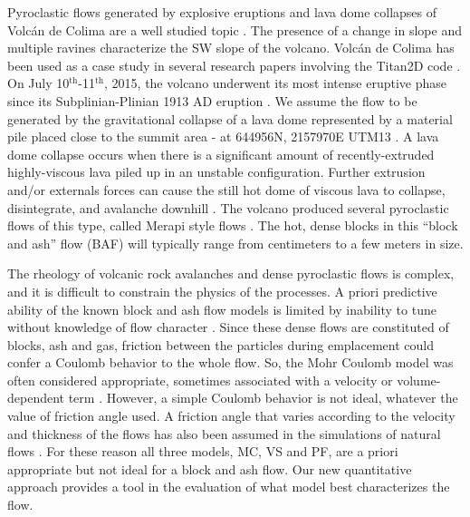 \documentclass{article}
\begin{document}
Pyroclastic flows generated by explosive eruptions and lava dome collapses of Volc{\'a}n de Colima are a well studied topic \citep{DelPozzo1995,Sheridan1995,Saucedo2002,Saucedo2004,Saucedo2005,Sarocchi2011,Capra2015}. The presence of a change in slope and multiple ravines characterize the SW slope of the volcano. Volc{\'a}n de Colima has been used as a case study in several research papers involving the Titan2D code \citep{Rupp2004, Rupp2006, Dalbey2008, Yu2009, Sulpizio2010, Capra2011, Aghakhani2016}. On July 10$^{\mathrm{th}}$-11$^{\mathrm{th}}$, 2015, the volcano underwent its most intense eruptive phase since its Subplinian-Plinian 1913 AD eruption \citep{Saucedo2010, Zobin2015, ReyesDaVilla2016, Capra2016, Macorps2018}. We assume the flow to be generated by the gravitational collapse of a lava dome represented by a material pile placed close to the summit area - at 644956N, 2157970E UTM13 \citep{Rupp2006,Aghakhani2016}. A lava dome collapse occurs when there is a significant amount of recently-extruded highly-viscous lava piled up in an unstable configuration. Further extrusion and/or externals forces can cause the still hot dome of viscous lava to collapse, disintegrate, and avalanche downhill \citep{Bursik2005, Wolpert2016, Hyman2018}. The volcano produced several pyroclastic flows of this type, called Merapi style flows \citep{Macorps2018}. The hot, dense blocks in this ``block and ash'' flow (BAF) will typically range from centimeters to a few meters in size.

The rheology of volcanic rock avalanches and dense pyroclastic flows is complex, and it is difficult to constrain the physics of the processes. A priori predictive ability of the known block and ash flow models is limited by inability to tune without knowledge of flow character \citep{Patra2005}. Since these dense flows are constituted of blocks, ash and gas, friction between the particles during emplacement could confer a Coulomb behavior to the whole flow. So, the Mohr Coulomb model was often considered appropriate, sometimes associated with a velocity or volume-dependent term \citep{Spiller2014}. However, a simple Coulomb behavior is not ideal, whatever the value of friction angle used. A friction angle that varies according to the velocity and thickness of the flows has also been assumed in the simulations of natural flows \citep{Kelfoun2011}. For these reason all three models, MC, VS and PF, are a priori appropriate but not ideal for a block and ash flow. Our new quantitative approach provides a tool in the evaluation of what model best characterizes the flow.
\end{document}
